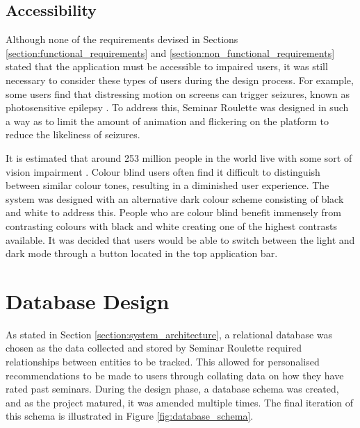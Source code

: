 \documentclass{l4proj}
\begin{document}
\subsection{Accessibility}

Although none of the requirements devised in Sections \ref{section:functional_requirements} and \ref{section:non_functional_requirements} stated that the application must be accessible to impaired users, it was still necessary to consider these types of users during the design process. For example, some users find that distressing motion on screens can trigger seizures, known as photosensitive epilepsy \citep{userinterfaceaccessibility}. To address this, Seminar Roulette was designed in such a way as to limit the amount of animation and flickering on the platform to reduce the likeliness of seizures.

It is estimated that around 253 million people in the world live with some sort of vision impairment \citep{colourblindness}. Colour blind users often find it difficult to distinguish between similar colour tones, resulting in a diminished user experience. The system was designed with an alternative dark colour scheme consisting of black and white to address this. People who are colour blind benefit immensely from contrasting colours with black and white creating one of the highest contrasts available. It was decided that users would be able to switch between the light and dark mode through a button located in the top application bar.

\section{Database Design}
\label{section:database_design}

As stated in Section \ref{section:system_architecture}, a relational database was chosen as the data collected and stored by Seminar Roulette required relationships between entities to be tracked. This allowed for personalised recommendations to be made to users through collating data on how they have rated past seminars. During the design phase, a database schema was created, and as the project matured, it was amended multiple times. The final iteration of this schema is illustrated in Figure \ref{fig:database_schema}.
\end{document}
